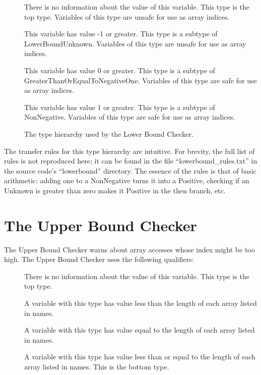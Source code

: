 \begin{description}
\item[]
  There is no information about the value of this variable.
  This type is the top type. Variables of this type are
  unsafe for use as array indices.
\item[]
  This variable has value -1 or greater. This type is a subtype of LowerBoundUnknown.
  Variables of this type are unsafe for use as array indices.
\item[]
  This variable has value 0 or greater. This type is a subtype of GreaterThanOrEqualToNegativeOne.
  Variables of this type are safe for use as array indices.
\item[]
  This variable has value 1 or greater. This type is a subtype of NonNegative.
  Variables of this type are safe for use as array indices.
\end{description}

\begin{figure}
\caption{The type hierarchy used by the Lower Bound Checker.}
\label{fig-lowerbound-types}
\end{figure}

The transfer rules for this type hierarchy are intuitive. For brevity,
the full list of rules is not reproduced here; it can be found in the file
``lowerbound\_rules.txt'' in the source code's ``lowerbound'' directory.
The essence of the rules is that of basic arithmetic: adding one to a
NonNegative turns it into a Positive, checking if an Unknown is greater
than zero makes it Positive in the then branch, etc.

\section{The Upper Bound Checker\label{index-upperbound}}

The Upper Bound Checker warns about array accesses whose index might be
too high. The Upper Bound Checker uses the following
qualifiers:

\begin{description}
\item[]
  There is no information about the value of this variable.
  This type is the top type.
\item[]
  A variable with this type
  has value less than the length of each array listed in names.
\item[]
  A variable with this type
  has value equal to the length of each array listed in names.
\item[]
  A variable with this type
  has value less than or equal to the length of each array listed in names.
  This is the bottom type.
\end{description}

